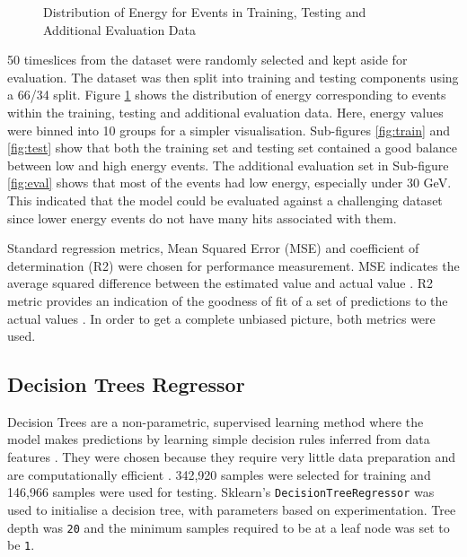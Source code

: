 \begin{figure}[ht!]   
\centering
{}
\caption[]{Distribution of Energy for Events in Training, Testing and Additional Evaluation Data}
\label{fig:energy_train_test_eval}
\end{figure}


50 timeslices from the dataset were randomly selected and kept aside for evaluation. The dataset was then split into training and testing components using a 66/34 split. Figure \ref{fig:energy_train_test_eval} shows the distribution of energy corresponding to events within the training, testing and additional evaluation data. Here, energy values were binned into 10 groups for a simpler visualisation. Sub-figures \ref{fig:train} and \ref{fig:test} show that both the training set and testing set contained a good balance between low and high energy events. The additional evaluation set in Sub-figure \ref{fig:eval} shows that most of the events had low energy, especially under 30 GeV. This indicated that the model could be evaluated against a challenging dataset since lower energy events do not have many hits associated with them. 


Standard regression metrics, Mean Squared Error (MSE) and coefficient of determination (R2) were chosen for performance measurement. MSE indicates the average squared difference between the estimated value and actual value \cite{montgomery2012introduction}. R2 metric provides an indication of the goodness of fit of a set of predictions to the actual values \cite{montgomery2012introduction}. In order to get a complete unbiased picture, both metrics were used.

 
\subsection{Decision Trees Regressor}
Decision Trees are a non-parametric, supervised learning method where the model makes predictions by learning simple decision rules inferred from data features \cite{breiman1984classification}. They were chosen because they require very little data preparation and  are computationally efficient \cite{breiman1984classification}. 342,920 samples were selected for training and 146,966 samples were used for testing. Sklearn's \texttt{DecisionTreeRegressor} was used to initialise a decision tree, with parameters based on experimentation. Tree depth was \texttt{20} and the minimum samples required to be at a leaf node was set to be \texttt{1}. 

